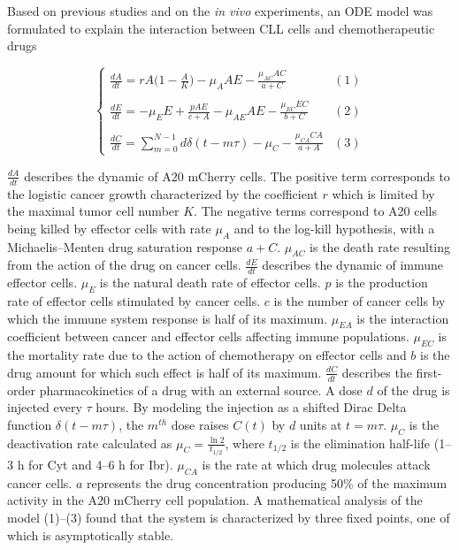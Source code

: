 Based on previous studies and on the \textit{in vivo} experiments, an ODE model was formulated to explain the interaction between CLL cells and chemotherapeutic drugs

\[
\begin{cases} 
	\frac{dA}{dt} = rA \bigl( 1 - \frac{A}{K} \bigr) - \mu_A AE - \frac{\mu_{AC} AC}{a+C} & (1)\\ \\
	\frac{dE}{dt} = -\mu_E E + \frac{pAE}{c+A} - \mu_{AE} AE - \frac{\mu_{EC} EC}{b+C} & (2) \\ \\
	\frac{dC}{dt} = \sum_{m=0}^{N-1} d\delta (t-m\tau) - \mu_{C} - \frac{\mu_{CA} CA}{a+A} & (3) 
\end{cases}
\]

$\frac{dA}{dt}$ describes the dynamic of A20 mCherry cells. The positive term corresponds to the logistic cancer growth characterized by the coefficient $r$ which is limited by the maximal tumor cell number $K$. 
The negative terms correspond to A20 cells being killed by effector cells with rate $\mu_A$ and to the log-kill hypothesis, with a Michaelis–Menten drug saturation response $a + C$. $\mu_{AC}$ is the death rate resulting from the action of the drug on cancer cells.
$\frac{dE}{dt}$ describes the dynamic of immune effector cells. $\mu_{E}$ is the natural death rate of effector cells. $p$ is the production rate of effector cells stimulated by cancer cells. $c$ is the number of cancer cells by which the immune system response is half of its maximum. 
$\mu_{EA}$ is the interaction coefficient between cancer and effector cells affecting immune populations. $\mu_{EC}$ is the mortality rate due to the action of chemotherapy on effector cells and $b$ is the drug amount for which such effect is half of its maximum.
$\frac{dC}{dt}$ describes the first-order pharmacokinetics of a drug with an external source. A dose $d$ of the drug is injected every $\tau$ hours. By modeling the injection as a shifted Dirac Delta function $\delta (t - m\tau)$, the $m^{th}$ dose raises $C(t)$ by $d$ units at $t=m\tau$. $\mu_C$ is the deactivation rate calculated as $\mu_C = \frac{\ln 2}{t_{1/2}}$, where $t_{1/2}$ is the elimination half-life (1–3 h for Cyt and 4–6 h for Ibr). $\mu_{CA}$ is the rate at which drug molecules attack cancer cells. 
$a$ represents the drug concentration producing 50\% of the maximum activity in the A20 mCherry cell population. A mathematical analysis of the model (1)–(3) found that the system is characterized by three fixed points, one of which is asymptotically stable.
